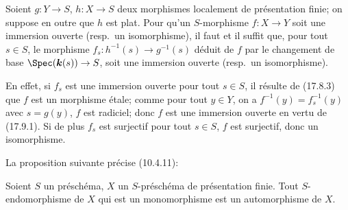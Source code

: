 \begin{corollary}[17.9.5]
\label{IV.17.9.5}
Soient $g:Y\to S$, $h:X\to S$ deux morphismes localement de présentation finie; on suppose en outre que $h$ est \textup{plat}. Pour qu'un $S$-morphisme $f:X\to Y$ soit une immersion ouverte \textup{(resp.}\ un isomorphisme\textup{)}, il faut et il suffit que, pour tout $s\in S$, le morphisme $f_s:h^{-1}(s)\to g^{-1}(s)$ déduit de $f$ par le changement de base $\Spec(\boldsymbol{k}(s))\to S$, soit une immersion ouverte \textup{(resp.}\ un isomorphisme\textup{)}.
\end{corollary}

En effet, si $f_s$ est une immersion ouverte pour tout $s\in S$, il résulte de (17.8.3) que $f$ est un morphisme étale; comme pour tout $y\in Y$, on a $f^{-1}(y)=f_s^{-1}(y)$ avec $s=g(y)$, $f$ est radiciel; donc $f$ est une immersion ouverte en vertu de (17.9.1). Si de plus $f_s$ est surjectif pour tout $s\in S$, $f$ est surjectif, donc un isomorphisme.

La proposition suivante précise (10.4.11):

\begin{proposition}[17.9.6]
Soient $S$ un préschéma, $X$ un $S$-préschéma de présentation finie. Tout $S$-endomorphisme de $X$ qui est un monomorphisme est un automorphisme de $X$.
\end{proposition}

